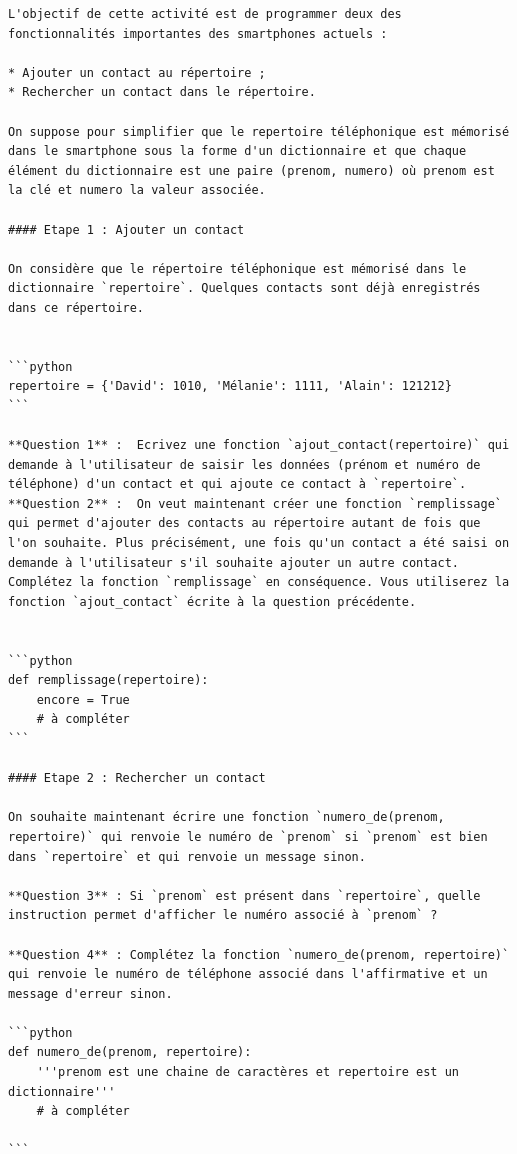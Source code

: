 \documentclass[
]{article}
\begin{document}
\begin{verbatim}
L'objectif de cette activité est de programmer deux des fonctionnalités importantes des smartphones actuels :

* Ajouter un contact au répertoire ;
* Rechercher un contact dans le répertoire.

On suppose pour simplifier que le repertoire téléphonique est mémorisé dans le smartphone sous la forme d'un dictionnaire et que chaque élément du dictionnaire est une paire (prenom, numero) où prenom est la clé et numero la valeur associée.

#### Etape 1 : Ajouter un contact

On considère que le répertoire téléphonique est mémorisé dans le dictionnaire `repertoire`. Quelques contacts sont déjà enregistrés dans ce répertoire.


```python
repertoire = {'David': 1010, 'Mélanie': 1111, 'Alain': 121212}
```

**Question 1** :  Ecrivez une fonction `ajout_contact(repertoire)` qui demande à l'utilisateur de saisir les données (prénom et numéro de téléphone) d'un contact et qui ajoute ce contact à `repertoire`.  
**Question 2** :  On veut maintenant créer une fonction `remplissage` qui permet d'ajouter des contacts au répertoire autant de fois que l'on souhaite. Plus précisément, une fois qu'un contact a été saisi on demande à l'utilisateur s'il souhaite ajouter un autre contact. Complétez la fonction `remplissage` en conséquence. Vous utiliserez la fonction `ajout_contact` écrite à la question précédente.  


```python
def remplissage(repertoire):
    encore = True
    # à compléter
```
        
#### Etape 2 : Rechercher un contact

On souhaite maintenant écrire une fonction `numero_de(prenom, repertoire)` qui renvoie le numéro de `prenom` si `prenom` est bien dans `repertoire` et qui renvoie un message sinon. 

**Question 3** : Si `prenom` est présent dans `repertoire`, quelle instruction permet d'afficher le numéro associé à `prenom` ?

**Question 4** : Complétez la fonction `numero_de(prenom, repertoire)` qui renvoie le numéro de téléphone associé dans l'affirmative et un message d'erreur sinon.

```python
def numero_de(prenom, repertoire):
    '''prenom est une chaine de caractères et repertoire est un dictionnaire'''
    # à compléter
    
```
\end{verbatim}
\end{document}

